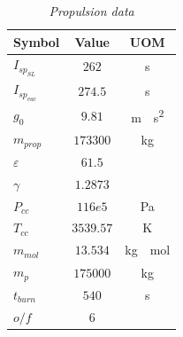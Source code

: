 \documentclass[12pt,fleqn,openany]{book} %
\begin{document}
\begin{table}[h]
	\centering
	\begin{tabular}{ l c c}
		\toprule
		Symbol									&Value 				&UOM	\\
		\midrule                                                                                                             
		$I_{sp_{SL}}  	$						&$262    $			&\si{\second}                       \\
		$I_{sp_{vac}} 	$						&$274.5  $			&\si{\second}                       \\
		$g_0			$							&$9.81   $		&	\si{\meter\over\second\squared}\\
		$m_{prop}   		$						&$173300 $		&	\si{\kilogram}					\\
		$\varepsilon		$							&$61.5   $		&	\si{}                           \\
		$\gamma			$					    &$1.2873 $			&\si{}                               \\
		$P_{cc}			$						    &$116e5  $		&	\si{\pascal}                    \\
		$T_{cc}			$						    &$3539.57$		&	\si{\kelvin}                    \\
		$m_{mol}    		$						&$13.534 $		&	\si{\kilogram\over\mole}            \\
		$m_p      		$						&$175000 $			&\si{\kilogram}                      \\
		$t_{burn}   		$						&$540    $		&	\si{\second}                    \\
		$o/f$									&$6$  \\
		\bottomrule
	\end{tabular} 
	\caption{\emph{Propulsion data}}
	\label{tab:prdata}
\end{table}
\end{document}
